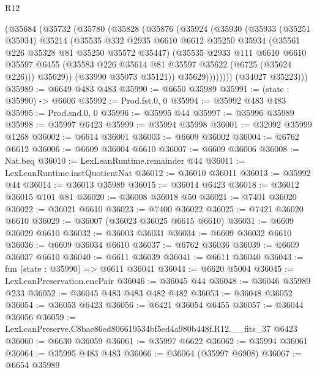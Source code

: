 \begin{lexlean}{R12}
\begin{coremodule}
          (@35684
            (@35732
              (@35780
                (@35828
                  (@35876
                    (@35924
                      (@35930
                        (@35933
                          (@35251 @35934)
                          @35214
                          (@35535
                            @332
                            @2935
                            @6610
                            @6612
                            @35250
                            @35934
                            (@35561 @226 @35328 @81 @35250 @35572 @35447)
                            (@35535
                              @2933
                              @111
                              @6610
                              @6610
                              @35597
                              @6455
                              (@35583 @226 @35614 @81 @35597 @35622 (@6725 (@35624 @226)))
                              @35629))
                          (@33990 @35073 @35121))
                        @35629))))))))
        (@34027 @35223)))
@35989 := @6649 @483 @483
@35990 := @6650 @35989
@35991 := (state : @35990) -> @6606
@35992 := Prod.fst.{0, 0}
@35994 := @35992 @483 @483
@35995 := Prod.snd.{0, 0}
@35996 := @35995 @44
@35997 := @35996 @35989
@35998 := @35997 @6423
@35999 := @35994 @35998
@36001 := @32092 @35999 @1268
@36002 := @6614 @36001
@36003 := @6609 @36002
@36004 := @6762 @6612
@36006 := @6609 @36004 @6610
@36007 := @6609 @36006
@36008 := Nat.beq
@36010 := LexLeanRuntime.remainder @44
@36011 := LexLeanRuntime.instQuotientNat
@36012 := @36010 @36011
@36013 := @35992 @44
@36014 := @36013 @35989
@36015 := @36014 @6423
@36018 := @36012 @36015 @101 @81
@36020 := @36008 @36018 @50
@36021 := @7401 @36020
@36022 := @36021 @6610
@36023 := @7400 @36022
@36025 := @7421 @36020 @6610
@36029 := @36007 (@36023 @36025 @6615 @6610)
@36031 := @6609 @36029 @6610
@36032 := @36003 @36031
@36034 := @6609 @36032 @6610
@36036 := @6609 @36034 @6610
@36037 := @6762 @36036
@36039 := @6609 @36037 @6610
@36040 := @6611 @36039
@36041 := @6611 @36040
@36043 := fun (state : @35990) => @6611 @36041
@36044 := @6620 @5004
@36045 := LexLeanPreservation.encPair
@36046 := @36045 @44
@36048 := @36046 @35989 @233
@36052 := @36045 @483 @483 @482 @482
@36053 := @36048 @36052
@36054 := @36053 @6423
@36056 := @6421 @36054 @6455
@36057 := @36044 @36056
@36059 := LexLeanPreserve.C8bae86ed806619534bf5ed4a980b448f.R12.__fits_37 @6423
@36060 := @6630 @36059
@36061 := @35997 @6622
@36062 := @35994 @36061
@36064 := @35995 @483 @483
@36066 := @36064 (@35997 @6908)
@36067 := @6654 @35989

\end{coremodule}
\end{lexlean}
